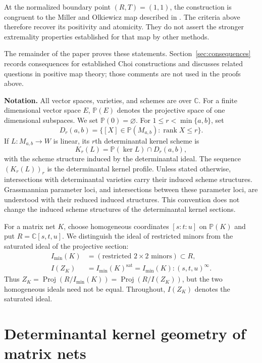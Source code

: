 \documentclass[11pt]{amsart}
\newcommand{\chg}[1]{#1}
\newcommand{\rank}{\operatorname{rank}}
\newcommand{\sat}{\mathrm{sat}}
\theoremstyle{plain}
\theoremstyle{definition}
\theoremstyle{remark}
\begin{document}
\chg{At the normalized boundary point $(R,T)=(1,1)$, the construction is congruent to the Miller and Olkiewicz map described in \cite{MillerOlkiewicz2015,MarciniakRutkowski2017}. The criteria above therefore recover its positivity and atomicity. They do not assert the stronger extremality properties established for that map by other methods.}

The remainder of the paper proves these statements. Section~\ref{sec:consequences} records consequences for established Choi constructions and discusses related questions in positive map theory; those comments are not used in the proofs above.

\medskip
\noindent\textbf{Notation.}
All vector spaces, varieties, and schemes are over $\mathbb C$. For a \chg{finite dimensional} vector space $E$, $\mathbb P(E)$ denotes the projective space of \chg{one dimensional} subspaces. We set $\mathbb P(0)=\varnothing$. For $1\le r<\min\{a,b\}$, set
\[
D_r(a,b)=\{[X]\in\mathbb P(M_{a,b}):\rank X\le r\}.
\]
If $L:M_{a,b}\to W$ is linear, its $r$th determinantal kernel scheme is
\[
K_r(L)=\mathbb P(\ker L)\cap D_r(a,b),
\]
with the scheme structure induced by the determinantal ideal. The sequence $(K_r(L))_r$ is the determinantal kernel profile. Unless stated otherwise, intersections with determinantal varieties carry their induced scheme structures. Grassmannian parameter loci, and intersections between these parameter loci, are understood with their reduced induced structures. This convention does not change the induced scheme structures of the determinantal kernel sections.

{
For a matrix net $K$, choose homogeneous coordinates $[s:t:u]$ on $\mathbb P(K)$ and put $R=\mathbb C[s,t,u]$. We distinguish the ideal of restricted minors from the saturated ideal of the projective section:
\[
\begin{aligned}
I_{\min}(K)&=(\text{restricted }2\times2\text{ minors})\subset R,\\
I(Z_K)&=I_{\min}(K)^\sat
       =I_{\min}(K):(s,t,u)^\infty.
\end{aligned}
\]
Thus $Z_K=\operatorname{Proj}(R/I_{\min}(K))=\operatorname{Proj}(R/I(Z_K))$, but the two homogeneous ideals need not be equal. Throughout, $I(Z_K)$ denotes the saturated ideal.
}

\section{Determinantal kernel geometry of matrix nets}\label{sec:geometry}
\end{document}
